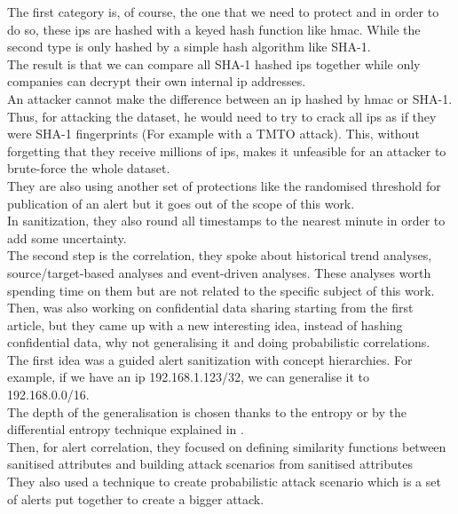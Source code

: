 \documentclass{eplmastersthesis}
\begin{document}
The first category is, of course, the one that we need to protect and in order to do so, these \gls{ip}s are hashed with a keyed hash function like \gls{hmac}. While the second type is only hashed by a simple hash algorithm like SHA-1.\\
The result is that we can compare all SHA-1 hashed \gls{ip}s together while only companies can decrypt their own internal \gls{ip} addresses.\\
An attacker cannot make the difference between an \gls{ip} hashed by \gls{hmac}  or SHA-1. Thus, for attacking the dataset, he would need to try to crack all \gls{ip}s as if they were SHA-1 fingerprints (For example with a TMTO attack). This, without forgetting that they receive millions of \gls{ip}s, makes it unfeasible for an attacker to brute-force the whole dataset.\\
They are also using another set of protections like the randomised threshold for publication of an alert but it goes out of the scope of this work.\\ 
In sanitization, they also round all timestamps to the nearest minute in order to add some uncertainty.\\
The second step is the correlation, they spoke about historical trend analyses, source/target-based analyses and event-driven analyses. These analyses worth spending time on them but are not related to the specific subject of this work.\\

Then, \cite{xu2005privacy} was also working on confidential data sharing starting from the first article, but they came up with a new interesting idea, instead of hashing confidential data, why not generalising it and doing probabilistic correlations.\\
The first idea was a guided alert sanitization with concept hierarchies. For example, if we have an \gls{ip} 192.168.1.123/32, we can generalise it to 192.168.0.0/16.\\
The depth of the generalisation is chosen thanks to the entropy or by the differential entropy technique explained in \cite{cover1991elements}.
\\
Then, for alert correlation, they focused on defining similarity functions between sanitised attributes and building attack scenarios from sanitised attributes\\
They also used a technique to create probabilistic attack scenario which is a set of alerts put together to create a bigger attack.\\
\end{document}
